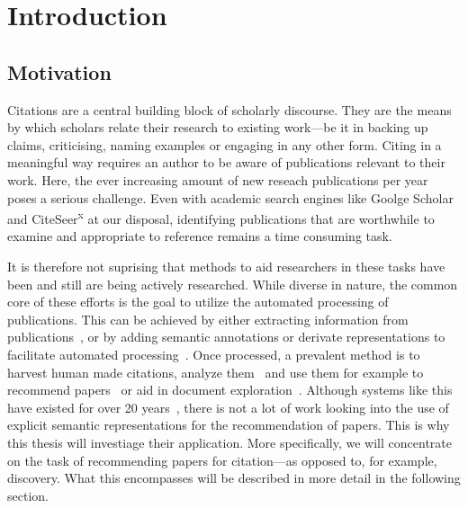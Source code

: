 \chapter{Introduction}\label{chap:introduction}
\section{Motivation}
Citations are a central building block of scholarly discourse. They are the means by which scholars relate their research to existing work---be it in backing up claims, criticising, naming examples or engaging in any other form. Citing in a meaningful way requires an author to be aware of publications relevant to their work.
Here, the ever increasing amount of new reseach publications per year poses a serious challenge. Even with academic search engines like Goolge Scholar and CiteSeer\textsuperscript{x} at our disposal, identifying publications that are worthwhile to examine and appropriate to reference remains a time consuming task.

It is therefore not suprising that methods to aid researchers in these tasks have been and still are being actively researched. While diverse in nature, the common core of these efforts is the goal to utilize the automated processing of publications. This can be achieved by either extracting information from publications~\cite{Nasar2018,Beel2016}, or by adding semantic annotations or derivate representations to facilitate automated processing~\cite{BuckinghamShum2000,Peroni2012,Huh2014,Jaradeh2019}. %
Once processed, a prevalent method is to harvest human made citations, analyze them~\cite{Abujbara2013,Teufel2006a} and use them for example to recommend papers~\cite{Beel2016} or aid in document exploration~\cite{Berger2016}. Although systems like this have existed for over 20 years~\cite{Bollacker1998,Beel2016}, there is not a lot of work looking into the use of explicit semantic representations for the recommendation of papers.
This is why this thesis will investiage their application. More specifically, we will concentrate on the task of recommending papers for citation---as opposed to, for example, discovery. What this encompasses will be described in more detail in the following section.

